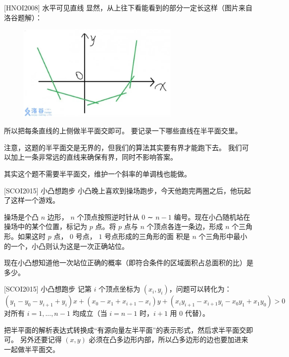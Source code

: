 \documentclass{beamer}
\begin{document}
\begin{frame}{ [HNOI2008] 水平可见直线}
    \footnotesize
    显然，从上往下看能看到的部分一定长这样（图片来自洛谷题解）：
    \begin{figure}[H]
        \centering
        \includegraphics[width=0.7\textwidth]{pic/hnoi2008.png}
    \end{figure}

    所以把每条直线的上侧做半平面交即可。
    要记录一下哪些直线在半平面交里。

    \vspace{1em}
    注意，这题的半平面交是无界的，但我们的算法其实要有界才能跑下去。
    我们可以加上一条非常远的直线来确保有界，同时不影响答案。

    \vspace{1em}\pause
    其实这个题不需要半平面交，维护一个斜率的单调栈也能做。
\end{frame}

\begin{frame}{[SCOI2015] 小凸想跑步}
    \small
    小凸晚上喜欢到操场跑步，今天他跑完两圈之后，他玩起了这样一个游戏。

    操场是个凸 $n$ 边形， $n$ 个顶点按照逆时针从 $0$ ∼ $n - 1$ 编号。现在小凸随机站在操场中的某个位置，标记为 $p$ 点。将 $p$ 点与 $n$ 个顶点各连一条边，形成 $n$ 个三角形。如果这时 $p$ 点， $0$ 号点， $1$ 号点形成的三角形的面
    积是 $n$ 个三角形中最小的一个，小凸则认为这是一次正确站位。
    
    现在小凸想知道他一次站位正确的概率（即符合条件的区域面积占总面积的比）是多少。
\end{frame}

\begin{frame}{[SCOI2015] 小凸想跑步}
    \small
    记第 $i$ 个顶点坐标为 $(x_i,y_i)$，问题可以转化为：
    \begin{equation}
        (y_1-y_0-y_{i+1}+y_i)x + (x_0-x_1+x_{i+1}-x_i)y + (x_iy_{i+1}-x_{i+1}y_i-x_0y_1+x_1y_0) > 0
    \end{equation}
    对所有 $i=1,...,n-1$ 均成立（当 $i=n-1$ 时，$i+1$ 用 $0$ 代替）。

    \vspace{1em}
    把半平面的解析表达式转换成“有源向量左半平面”的表示形式，然后求半平面交即可。
    另外还要记得 $(x,y)$ 必须在凸多边形内部，所以凸多边形的边也要加进来一起做半平面交。
\end{frame}
\end{document}
